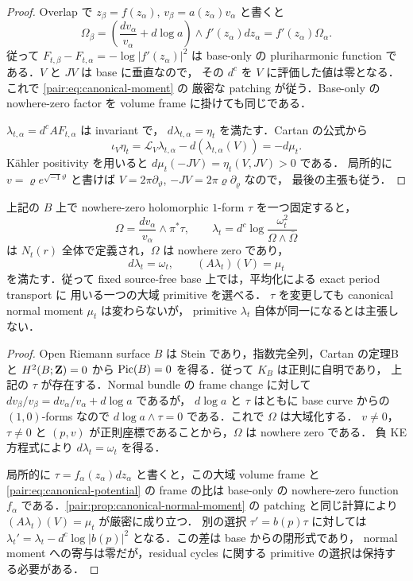 \begin{proof}
Overlap で $z_\beta=f(z_\alpha)$, $v_\beta=a(z_\alpha)v_\alpha$ と書くと
\[
 \Omega_\beta
 =\left(\frac{dv_\alpha}{v_\alpha}+d\log a\right)\wedge f'(z_\alpha)dz_\alpha
 =f'(z_\alpha)\Omega_\alpha.
\]
従って
$F_{t,\beta}-F_{t,\alpha}=-\log|f'(z_\alpha)|^2$
は base-only の pluriharmonic function である．$V$ と $JV$ は base に垂直なので，
その $d^c$ を $V$ に評価した値は零となる．これで \eqref{pair:eq:canonical-moment} の
厳密な patching が従う．Base-only の nowhere-zero factor を volume frame に掛けても同じである．

$\lambda_{t,\alpha}=d^cAF_{t,\alpha}$ は invariant で，
$d\lambda_{t,\alpha}=\eta_t$ を満たす．Cartan の公式から
\[
 \iota_V\eta_t
 =\mathcal L_V\lambda_{t,\alpha}-d(\lambda_{t,\alpha}(V))
 =-d\mu_t.
\]
Kähler positivity を用いると
$d\mu_t(-JV)=\eta_t(V,JV)>0$ である．
局所的に $v=\varrho e^{\sqrt{-1}\vartheta}$ と書けば
$V=2\pi\partial_\vartheta$, $-JV=2\pi\varrho\partial_\varrho$ なので，
最後の主張も従う．
\end{proof}

\begin{corollary}
\label{pair:cor:global-primitive}
上記の $B$ 上で nowhere-zero holomorphic $1$-form $\tau$ を一つ固定すると，
\[
 \Omega=\frac{dv_\alpha}{v_\alpha}\wedge\pi^*\tau,
 \qquad
 \lambda_t=d^c\log\frac{\omega_t^2}{\Omega\wedge\overline\Omega}
\]
は $N_t(r)$ 全体で定義され，$\Omega$ は nowhere zero であり，
\[
 d\lambda_t=\omega_t,\qquad (A\lambda_t)(V)=\mu_t
\]
を満たす．従って fixed source-free base 上では，平均化による exact period transport に
用いる一つの大域 primitive を選べる．
$\tau$ を変更しても canonical normal moment $\mu_t$ は変わらないが，
primitive $\lambda_t$ 自体が同一になるとは主張しない．
\end{corollary}

\begin{proof}
Open Riemann surface $B$ は Stein であり\cite{Forster}，指数完全列，Cartan の定理Bと
$H^2(B;\mathbf Z)=0$ から $\operatorname{Pic}(B)=0$ を得る．従って $K_B$ は正則に自明であり，
上記の $\tau$ が存在する．Normal bundle の frame change に対して
$dv_\beta/v_\beta=dv_\alpha/v_\alpha+d\log a$ であるが，
$d\log a$ と $\tau$ はともに base curve からの $(1,0)$-forms なので
$d\log a\wedge\tau=0$ である．これで $\Omega$ は大域化する．
$v\ne0$，$\tau\ne0$ と $(p,v)$ が正則座標であることから，$\Omega$ は nowhere zero である．
負 KE 方程式により $d\lambda_t=\omega_t$ を得る．

局所的に $\tau=f_\alpha(z_\alpha)dz_\alpha$ と書くと，この大域 volume frame と
\eqref{pair:eq:canonical-potential} の frame の比は base-only の nowhere-zero function
$f_\alpha$ である．\cref{pair:prop:canonical-normal-moment} の patching と同じ計算により
$(A\lambda_t)(V)=\mu_t$ が厳密に成り立つ．
別の選択 $\tau'=b(p)\tau$ に対しては
$\lambda_t'=\lambda_t-d^c\log|b(p)|^2$ となる．この差は base からの閉形式であり，
normal moment への寄与は零だが，residual cycles に関する primitive の選択は保持する必要がある．
\end{proof}

